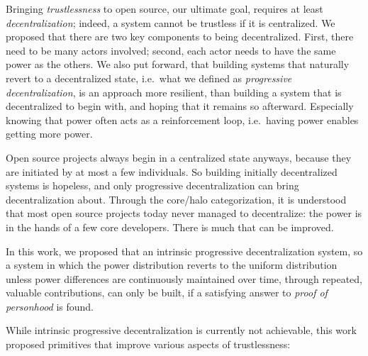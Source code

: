 \leavevmode{}%
Bringing \emph{trustlessness} to open source, our ultimate goal, requires at least \emph{decentralization}; indeed, a system cannot be trustless if it is centralized.
We proposed that there are two key components to being decentralized.
First, there need to be many actors involved; second, each actor needs to have the same power as the others.
We also put forward, that building systems that naturally revert to a decentralized state, i.e.\ what we defined as \emph{progressive decentralization}, is an approach more resilient, than building a system that is decentralized to begin with, and hoping that it remains so afterward.
Especially knowing that power often acts as a reinforcement loop, i.e.\ having power enables getting more power.

\leavevmode{}%
Open source projects always begin in a centralized state anyways, because they are initiated by at most a few individuals.
So building initially decentralized systems is hopeless, and only progressive decentralization can bring decentralization about.
Through the core/halo categorization, it is understood that most open source projects today never managed to decentralize: the power is in the hands of a few core developers.
There is much that can be improved.

\leavevmode{}%
In this work, we proposed that an intrinsic progressive decentralization system, so a system in which the power distribution reverts to the uniform distribution unless power differences are continuously maintained over time, through repeated, valuable contributions, can only be built, if a satisfying answer to \textit{proof of personhood} is found.

\leavevmode{}%
While intrinsic progressive decentralization is currently not achievable, this work proposed primitives that improve various aspects of trustlessness:


